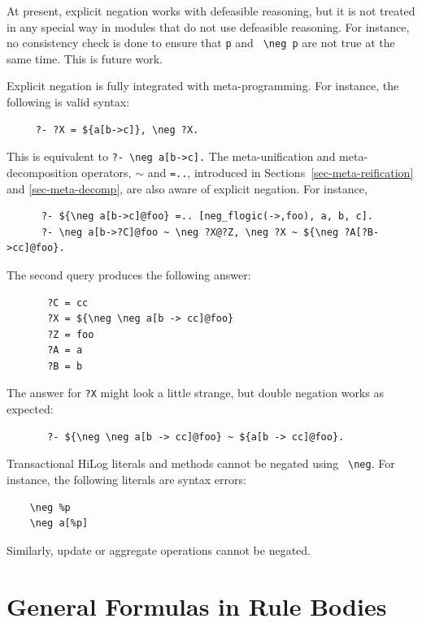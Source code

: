\documentclass[11pt]{article}
\newcommand{\ERGO}{\mbox{\smaller{\ensuremath{\cal{E}}\smaller{{\sc{RGO}}}}}\xspace}
\newcommand{\FLSYSTEM}{\ERGO}
\newcommand{\bs}{\textbackslash}
\newcommand{\RULELOGNEG}{{\texttt{{\bs}neg}}\xspace}
\begin{document}
At present, explicit negation works with defeasible reasoning, but it is
not treated in any special way in modules that do not use defeasible reasoning.
For instance, no consistency check is done to ensure that {\tt p} and {\tt
  \RULELOGNEG p} are not true at the same time. This is future work.

Explicit negation is fully integrated with meta-programming. For instance,
the following is valid syntax:
\begin{verbatim}
     ?- ?X = ${a[b->c]}, \neg ?X.
\end{verbatim}
This is equivalent to \verb|?- \neg a[b->c].|  The meta-unification and
meta-decomposition operators, {\tt $\sim$} and {\tt =..}, introduced in
Sections~\ref{sec-meta-reification} and \ref{sec-meta-decomp}, are
also aware of explicit negation. For instance, 
\begin{verbatim}
      ?- ${\neg a[b->c]@foo} =.. [neg_flogic(->,foo), a, b, c].
      ?- \neg a[b->?C]@foo ~ \neg ?X@?Z, \neg ?X ~ ${\neg ?A[?B->cc]@foo}.
\end{verbatim}
The second query produces the following answer:
\begin{verbatim}
       ?C = cc
       ?X = ${\neg \neg a[b -> cc]@foo}
       ?Z = foo
       ?A = a
       ?B = b
\end{verbatim}
The answer for {\tt ?X} might look a little strange, but double negation
works as expected:
\begin{verbatim}
       ?- ${\neg \neg a[b -> cc]@foo} ~ ${a[b -> cc]@foo}.
\end{verbatim}

Transactional HiLog literals and methods cannot be negated using {\tt
  \RULELOGNEG}. For instance, the following literals are syntax errors:
\begin{verbatim}
    \neg %p
    \neg a[%p]
\end{verbatim}
Similarly, \FLSYSTEM update or aggregate operations cannot be negated.


\section{General Formulas in Rule Bodies}\label{sec-lt}
\end{document}
